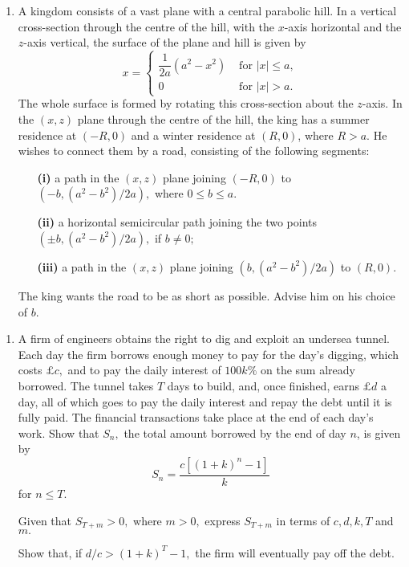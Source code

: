 \documentclass[a4, 11pt]{report}
\newlength{\qspace}
\newcounter{qnumber}
\newenvironment{question}%
 {\vspace{\qspace}
  \begin{enumerate}[\bfseries 1\quad][10]%
    \setcounter{enumi}{\value{qnumber}}%
    \item%
 }
{
  \end{enumerate}
  \filbreak
  \stepcounter{qnumber}
 }
\begin{document}
\begin{question}
	A kingdom consists of a vast plane with a central parabolic hill.
	In a vertical cross-section through the centre of the hill, with the
	$x$-axis horizontal and the $z$-axis vertical, the surface of the
	plane and hill is given by 
	\[
	x=\begin{cases}
	\dfrac{1}{2a}(a^{2}-x^{2}) & \mbox{ for }\left|x\right|\leqslant a,\\
	0 & \mbox{ for }\left|x\right|>a.
	\end{cases}
	\]
	The whole surface is formed by rotating this cross-section about the
	$z$-axis. In the $(x,z)$ plane through the centre of the hill, the
	king has a summer residence at $(-R,0)$ and a winter residence at
	$(R,0)$, where $R>a.$ He wishes to connect them by a road, consisting
	of the following segments: 

\begin{itemize}
\setlength{\itemsep}{3mm}
\item[\bf (i)] a path in the $(x,z)$ plane joining $(-R,0)$ to $(-b,(a^{2}-b^{2})/2a),$
	where $0\leqslant b\leqslant a.$
\item[\bf (ii)] a horizontal semicircular path joining the two points $(\pm b,(a^{2}-b^{2})/2a),$
	if $b\neq0;$
\item[\bf (iii)] a path in the $(x,z)$ plane joining $(b,(a^{2}-b^{2})/2a)$ to $(R,0).$
	\end{itemize}

	The king wants the road to be as short as possible. Advise him on
	his choice of $b.$
\end{question}


\begin{question}
A firm of engineers obtains the right to dig and exploit an undersea
tunnel. Each day the firm borrows enough money to pay for the day's
digging, which costs $\pounds c,$ and to pay the daily interest of
$100k\%$ on the sum already borrowed. The tunnel takes $T$ days
to build, and, once finished, earns $\pounds d$ a day, all of which
goes to pay the daily interest and repay the debt until it is fully
paid. The financial transactions take place at the end of each day's
work. Show that $S_{n},$ the total amount borrowed by the end of
day $n$, is given by 
\[
S_{n}=\frac{c[(1+k)^{n}-1]}{k}
\]
for $n\leqslant T$. 


Given that $S_{T+m}>0,$ where $m>0,$ express $S_{T+m}$ in terms
of $c,d,k,T$ and $m.$ 


Show that, if $d/c>(1+k)^{T}-1,$ the firm will eventually pay off
the debt. 
	\end{question}
	
\end{document}
